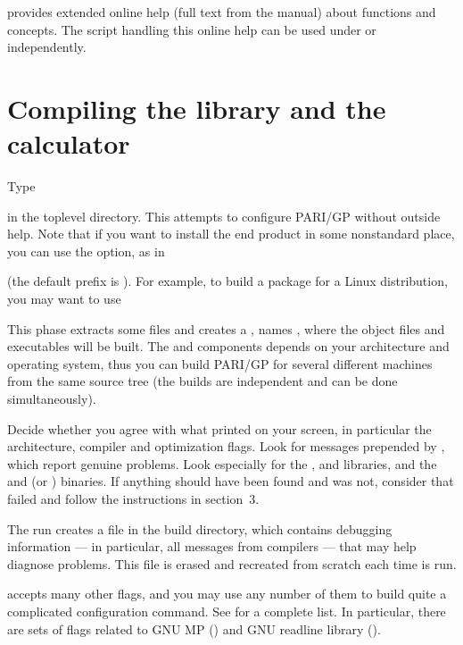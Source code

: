   \item {} provides extended online help (full text from the
manual) about functions and concepts. The script handling this online help
can be used under  or independently.

\section{Compiling the library and the  calculator}

 Type


\noindent in the toplevel directory. This attempts to configure PARI/GP
without outside help. Note that if you want to install the end product in
some nonstandard place, you can use the  option, as in


\noindent (the default prefix is ). For example, to build a
package for a Linux distribution, you may want to use


This phase extracts some files and creates a , names
\kbd{-}, where the
object files and executables will be built. The
 and  components depends on your architecture and
operating system, thus you can build PARI/GP for several different machines
from the same source tree (the builds are independent and can be done
simultaneously).

Decide whether you agree with what  printed on your screen, in
particular the architecture, compiler and optimization flags. Look for
messages prepended by \kbd{\#\#\#}, which report genuine problems.
Look especially for the ,  and  libraries,
and the  and  (or ) binaries.
If anything should have been found and was not, consider that 
failed and follow the instructions in section~3.

The  run creates a file  in the build
directory, which contains debugging information --- in particular, all
messages from compilers ---  that may help diagnose problems. This file
is erased and recreated from scratch each time  is run.

 accepts many other flags, and you may use any number of them
to build quite a complicated configuration command. See  for a complete list. In particular, there are sets of flags related
to GNU MP () and GNU readline library
().

